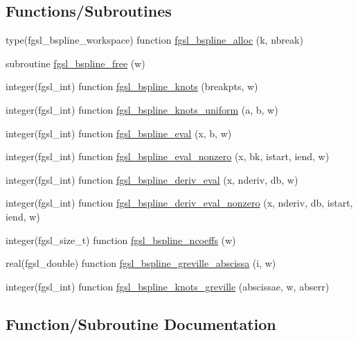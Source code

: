 \subsection*{Functions/\+Subroutines}
\begin{DoxyCompactItemize}
\item 
type(fgsl\+\_\+bspline\+\_\+workspace) function \hyperlink{bspline_8finc_a4e15c7b2231a5f1a625f5d182ca159ed}{fgsl\+\_\+bspline\+\_\+alloc} (k, nbreak)
\item 
subroutine \hyperlink{bspline_8finc_aa6355eaea88c1a3223784670cd61f944}{fgsl\+\_\+bspline\+\_\+free} (w)
\item 
integer(fgsl\+\_\+int) function \hyperlink{bspline_8finc_a0c926191aa070f99a3f01fd32fa1b95d}{fgsl\+\_\+bspline\+\_\+knots} (breakpts, w)
\item 
integer(fgsl\+\_\+int) function \hyperlink{bspline_8finc_ae8a83e75e87a6475b4ad8584c18c037d}{fgsl\+\_\+bspline\+\_\+knots\+\_\+uniform} (a, b, w)
\item 
integer(fgsl\+\_\+int) function \hyperlink{bspline_8finc_ad884eba33109f4963100c7a64601c9df}{fgsl\+\_\+bspline\+\_\+eval} (x, b, w)
\item 
integer(fgsl\+\_\+int) function \hyperlink{bspline_8finc_a2cf7b76c3b3eacc2458726ce7eec827a}{fgsl\+\_\+bspline\+\_\+eval\+\_\+nonzero} (x, bk, istart, iend, w)
\item 
integer(fgsl\+\_\+int) function \hyperlink{bspline_8finc_ac4ce634b5d07adac2ba4ec3035da2266}{fgsl\+\_\+bspline\+\_\+deriv\+\_\+eval} (x, nderiv, db, w)
\item 
integer(fgsl\+\_\+int) function \hyperlink{bspline_8finc_a833991eb00de5fd00732476be6996b2d}{fgsl\+\_\+bspline\+\_\+deriv\+\_\+eval\+\_\+nonzero} (x, nderiv, db, istart, iend, w)
\item 
integer(fgsl\+\_\+size\+\_\+t) function \hyperlink{bspline_8finc_a88f74da4054f622ccec25854d7d82a26}{fgsl\+\_\+bspline\+\_\+ncoeffs} (w)
\item 
real(fgsl\+\_\+double) function \hyperlink{bspline_8finc_a3919f7952797fb2dd676ae3f910c6d9e}{fgsl\+\_\+bspline\+\_\+greville\+\_\+abscissa} (i, w)
\item 
integer(fgsl\+\_\+int) function \hyperlink{bspline_8finc_ae82914f8a3d09b557ceac031a59363a0}{fgsl\+\_\+bspline\+\_\+knots\+\_\+greville} (abscissae, w, abserr)
\end{DoxyCompactItemize}


\subsection{Function/\+Subroutine Documentation}
\hypertarget{bspline_8finc_a4e15c7b2231a5f1a625f5d182ca159ed}{}
